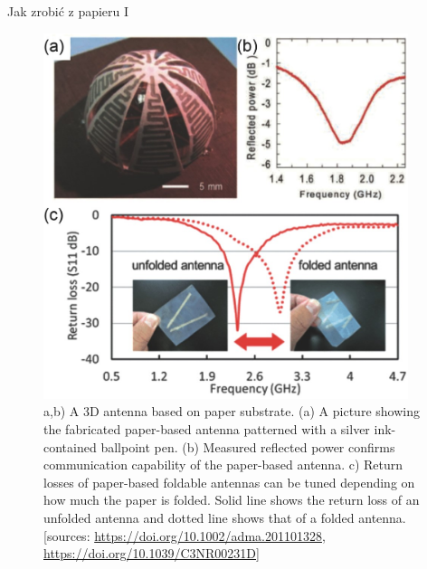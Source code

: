 \documentclass{beamer}
\begin{document}
\begin{frame}{Jak zrobić z papieru I}
        \begin{figure}
        \centering
        \begin{columns}
        \begin{column}{0.65\textwidth}
        \includegraphics[width=\textwidth]{fig10a.jpg}
        \end{column}
        \begin{column}{0.3\textwidth}
        \caption{a,b) A 3D antenna based on paper substrate. (a) A picture showing the fabricated paper-based antenna patterned with a silver ink-contained ballpoint pen. (b) Measured reflected power confirms communication capability of the paper-based antenna. c) Return losses of paper-based foldable antennas can be tuned depending on how much the paper is folded. Solid line shows the return loss of an unfolded antenna and dotted line shows that of a folded antenna.   \typeout{}
        [sources: \url{https://doi.org/10.1002/adma.201101328}, \url{https://doi.org/10.1039/C3NR00231D}]}
                \end{column}
        \end{columns}
    \end{figure}
\end{frame}
\end{document}
